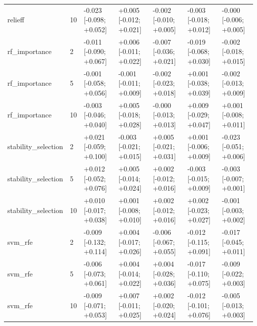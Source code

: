 \begin{table}[t]
\begin{tabular}{lllllll}
    relieff & 10 & -0.023 [-0.098; +0.052] & +0.005 [-0.012; +0.021] & -0.002 [-0.010; +0.005] & -0.003 [-0.018; +0.012] & -0.000 [-0.006; +0.005] \\
    rf\_importance & 2 & -0.011 [-0.090; +0.067] & +0.006 [-0.011; +0.022] & -0.007 [-0.036; +0.021] & -0.019 [-0.068; +0.030] & -0.002 [-0.018; +0.015] \\
    rf\_importance & 5 & -0.001 [-0.058; +0.056] & -0.001 [-0.011; +0.009] & -0.002 [-0.023; +0.018] & +0.001 [-0.038; +0.039] & -0.002 [-0.013; +0.009] \\
    rf\_importance & 10 & -0.003 [-0.046; +0.040] & +0.005 [-0.018; +0.028] & -0.000 [-0.013; +0.013] & +0.009 [-0.029; +0.047] & +0.001 [-0.008; +0.011] \\
    stability\_selection & 2 & +0.021 [-0.059; +0.100] & -0.003 [-0.021; +0.015] & +0.005 [-0.021; +0.031] & +0.001 [-0.006; +0.009] & -0.023 [-0.051; +0.006] \\
    stability\_selection & 5 & +0.012 [-0.052; +0.076] & +0.005 [-0.014; +0.024] & +0.002 [-0.012; +0.016] & -0.003 [-0.015; +0.009] & -0.003 [-0.007; +0.001] \\
    stability\_selection & 10 & +0.010 [-0.017; +0.038] & +0.001 [-0.008; +0.010] & +0.002 [-0.012; +0.016] & +0.002 [-0.023; +0.027] & -0.001 [-0.003; +0.002] \\
    svm\_rfe & 2 & -0.009 [-0.132; +0.114] & +0.004 [-0.017; +0.026] & -0.006 [-0.067; +0.055] & -0.012 [-0.115; +0.091] & -0.017 [-0.045; +0.011] \\
    svm\_rfe & 5 & -0.006 [-0.073; +0.061] & +0.004 [-0.014; +0.022] & +0.004 [-0.028; +0.036] & -0.017 [-0.110; +0.075] & -0.009 [-0.022; +0.003] \\
    svm\_rfe & 10 & -0.009 [-0.071; +0.053] & +0.007 [-0.011; +0.025] & +0.002 [-0.020; +0.024] & -0.012 [-0.101; +0.076] & -0.005 [-0.013; +0.003] \\
    \bottomrule
  \end{tabular}
\end{table}

